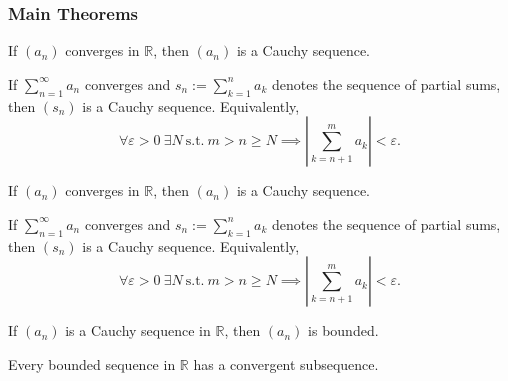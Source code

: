 \subsubsection{Main Theorems}


\begin{theorem}
If $(a_n)$ converges in $\mathbb{R}$, then $(a_n)$ is a Cauchy sequence.
\end{theorem}



\begin{corollary}
If $\sum_{n=1}^\infty a_n$ converges and $s_n:=\sum_{k=1}^n a_k$ denotes the sequence
of partial sums, then $(s_n)$ is a Cauchy sequence. Equivalently,
\[
\forall \varepsilon>0\ \exists N\ \text{s.t.}\ m>n\ge N \implies
\left|\sum_{k=n+1}^{m} a_k\right| < \varepsilon.
\]
\end{corollary}



\begin{theorem}
If $(a_n)$ converges in $\mathbb{R}$, then $(a_n)$ is a Cauchy sequence.
\end{theorem}



\begin{corollary}
If $\sum_{n=1}^\infty a_n$ converges and $s_n:=\sum_{k=1}^n a_k$ denotes the sequence
of partial sums, then $(s_n)$ is a Cauchy sequence. Equivalently,
\[
\forall \varepsilon>0\ \exists N\ \text{s.t.}\ m>n\ge N \implies
\left|\sum_{k=n+1}^{m} a_k\right| < \varepsilon.
\]
\end{corollary}



\begin{theorem}
If $(a_n)$ is a Cauchy sequence in $\mathbb{R}$, then $(a_n)$ is bounded.
\end{theorem}



\begin{theorem}
Every bounded sequence in $\mathbb{R}$ has a convergent subsequence.
\end{theorem}



